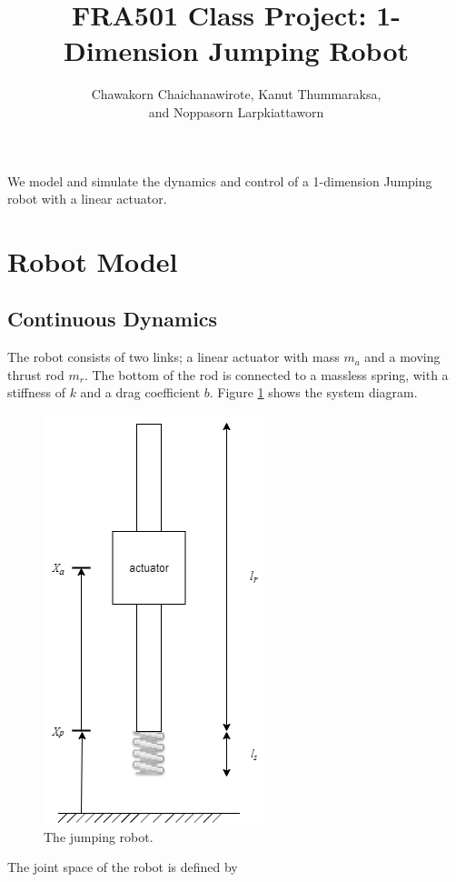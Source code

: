 \documentclass[12pt, a4paper]{report}
\title{FRA501 Class Project: 1-Dimension Jumping Robot}
\author{Chawakorn Chaichanawirote, Kanut Thummaraksa, 
	\\and Noppasorn Larpkiattaworn}
\begin{document}
\maketitle
We model and simulate the dynamics and control of a 1-dimension Jumping robot with a linear actuator.\par
\section*{Robot Model}
\subsection*{Continuous Dynamics}
The robot consists of two links; a linear actuator with mass $m_a$ and a moving thrust rod $m_r$. The bottom of the rod is connected to a massless spring, with a stiffness of $k$ and a drag coefficient $b$. Figure \ref{fig:system} shows the system diagram.

\begin{figure}[h]
	\vspace{1pt}
	\centering
	\includegraphics[scale=0.6]{images/JumpingRobot.png} 
	\caption{The jumping robot.}
	\label{fig:system}
\end{figure}\par

The joint space of the robot is defined by
\end{document}
